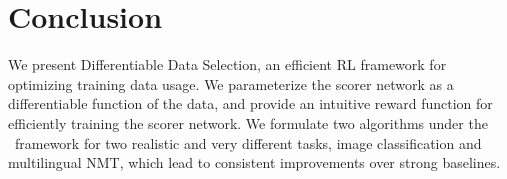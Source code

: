 \section{\label{sec:conclusion}Conclusion}
We present Differentiable Data Selection, an efficient RL framework for optimizing training data usage. We parameterize the scorer network as a differentiable function of the data, and provide an intuitive reward function for efficiently training the scorer network. We formulate two algorithms under the \dds~framework for two realistic and very different tasks, image classification and multilingual NMT, which lead to consistent improvements over strong baselines. 

